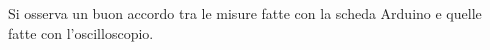 \documentclass[10pt,oneside,a4paper]{article}
\newenvironment{Figure}
  {\par\medskip\noindent\minipage{\linewidth}}
  {\endminipage\par\medskip}
\begin{document}
\begin{multicols}{2}
Si osserva un buon accordo tra le misure fatte con la scheda Arduino e quelle fatte con l'oscilloscopio.




\end{multicols}




\end{document}
